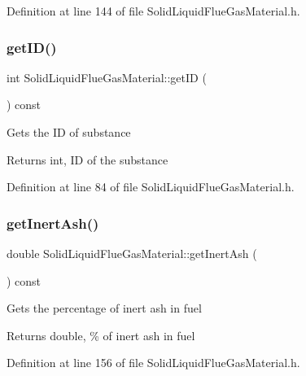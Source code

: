 Definition at line 144 of file Solid\+Liquid\+Flue\+Gas\+Material.\+h.

\mbox{\label{class_solid_liquid_flue_gas_material_afb124b546137da7ba99e31616198e0c8}} 
\subsubsection{\texorpdfstring{get\+I\+D()}{getID()}}
{\footnotesize\ttfamily int Solid\+Liquid\+Flue\+Gas\+Material\+::get\+ID (\begin{DoxyParamCaption}{ }\end{DoxyParamCaption}) const\hspace{0.3cm}{\ttfamily [inline]}}

Gets the ID of substance \begin{DoxyReturn}{Returns}
int, ID of the substance 
\end{DoxyReturn}


Definition at line 84 of file Solid\+Liquid\+Flue\+Gas\+Material.\+h.

\mbox{\label{class_solid_liquid_flue_gas_material_a0549b32b7b5423267d5f59cc96b98127}} 
\subsubsection{\texorpdfstring{get\+Inert\+Ash()}{getInertAsh()}}
{\footnotesize\ttfamily double Solid\+Liquid\+Flue\+Gas\+Material\+::get\+Inert\+Ash (\begin{DoxyParamCaption}{ }\end{DoxyParamCaption}) const\hspace{0.3cm}{\ttfamily [inline]}}

Gets the percentage of inert ash in fuel \begin{DoxyReturn}{Returns}
double, \% of inert ash in fuel 
\end{DoxyReturn}


Definition at line 156 of file Solid\+Liquid\+Flue\+Gas\+Material.\+h.

